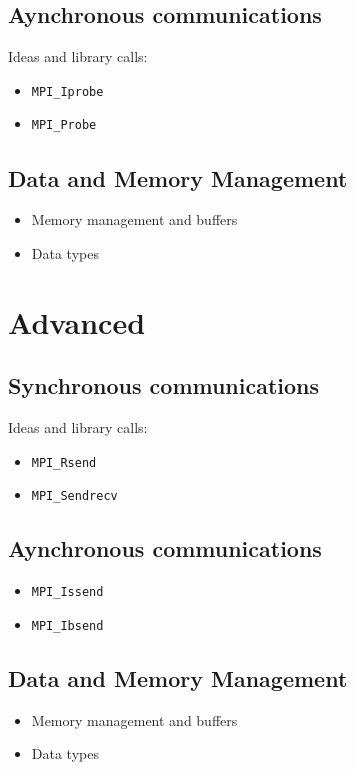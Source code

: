 \subsection{Aynchronous communications}

Ideas and library calls: \\
\begin{itemize}
\item \texttt{MPI\_Iprobe}
\item \texttt{MPI\_Probe}
\end{itemize}

\subsection{Data and Memory Management}

\begin{itemize}
\item Memory management and buffers
\item Data types
\end{itemize}


\section{Advanced}


\subsection{Synchronous communications}

Ideas and library calls: \\
\begin{itemize}
\item \texttt{MPI\_Rsend}
\item \texttt{MPI\_Sendrecv}
\end{itemize}

\subsection{Aynchronous communications}

\begin{itemize}
\item \texttt{MPI\_Issend}
\item \texttt{MPI\_Ibsend}
\end{itemize}

\subsection{Data and Memory Management}

\begin{itemize}
\item Memory management and buffers
\item Data types
\end{itemize}



